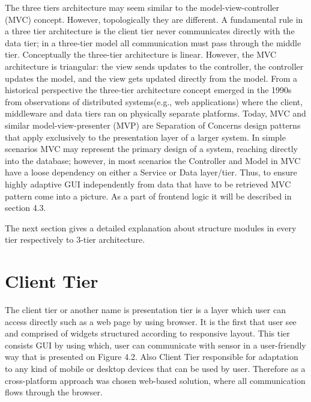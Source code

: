    The three tiers architecture may seem similar to the model-view-controller (MVC) concept. However, topologically they are different. A fundamental rule in a three tier architecture is the client tier never communicates directly with the data tier; in a three-tier model all communication must pass through the middle tier. Conceptually the three-tier architecture is linear. However, the MVC architecture is triangular: the view sends updates to the controller, the controller updates the model, and the view gets updated directly from the model.
   \newline
    From a historical perspective the three-tier architecture concept emerged in the 1990s from observations of distributed systems\cite{wiki:3tier}(e.g., web applications) where the client, middleware and data tiers ran on physically separate platforms. Today, MVC and similar model-view-presenter (MVP) are Separation of Concerns design patterns that apply exclusively to the presentation layer of a larger system. In simple scenarios MVC may represent the primary design of a system, reaching directly into the database; however, in most scenarios the Controller and Model in MVC have a loose dependency on either a Service or Data layer/tier. Thus, to ensure highly adaptive GUI independently from data that have to be retrieved MVC pattern come into a picture. As a part of frontend logic it will be described in section 4.3.

  The next section gives a detailed explanation about structure modules in every tier respectively to 3-tier architecture.

\section{Client Tier}
  The client tier or another name is presentation tier is a layer which user can access directly such as a web page by using browser. It is the first that user see and comprised of widgets structured according to responsive layout. This tier consists GUI by using which, user can communicate with sensor in a user-friendly way that is presented on Figure 4.2. Also Client Tier responsible for adaptation to any kind of mobile or desktop devices that can be used by user. Therefore as a cross-platform approach was chosen web-based solution, where all communication flows through the browser. 

